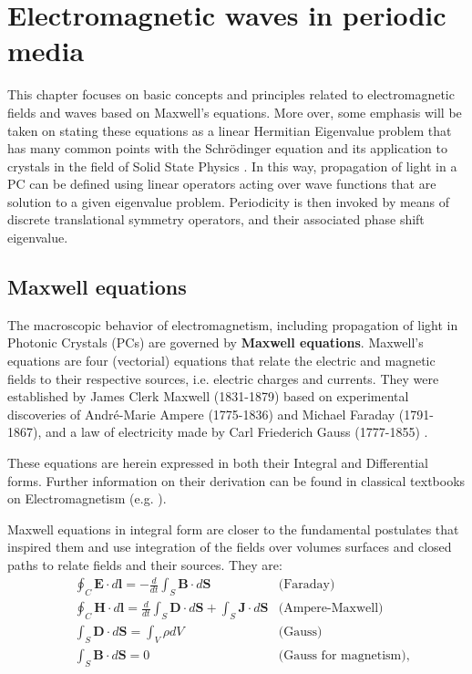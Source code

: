 \chapter{Electromagnetic waves in periodic media}
\label{ch:Electromagnetic waves in periodic media}

This chapter focuses on basic concepts and principles related to electromagnetic fields and waves based on Maxwell's equations. More over, some emphasis will be taken on stating these equations as a linear Hermitian Eigenvalue problem that has many common points with the Schr\"odinger equation and its application to crystals in the field of Solid State Physics \cite{Kittel2005}. 
In this way, propagation of light in a PC can be defined using linear operators acting over wave functions that are solution to a given eigenvalue problem.  Periodicity is then invoked by means of discrete translational symmetry operators, and their associated phase shift eigenvalue. 

\section{Maxwell equations}

The macroscopic behavior of electromagnetism, including propagation of light in Photonic Crystals (PCs) are governed by \textbf{Maxwell equations}. Maxwell's equations are four (vectorial) equations that relate the electric and magnetic fields to their respective sources, i.e. electric charges and currents. They were established by James Clerk Maxwell (1831-1879) based on experimental discoveries of Andr\'e-Marie Ampere (1775-1836) and Michael Faraday (1791-1867), and a law of electricity made by Carl Friederich Gauss (1777-1855) \cite{Jin2010}.

These equations are herein expressed in both their Integral and Differential forms. Further information on their derivation can be found in classical textbooks on Electromagnetism (e.g. \cite{Jackson1998}). 

Maxwell equations in integral form are closer to the fundamental postulates that inspired them and use integration of the fields over volumes surfaces and closed paths to relate fields and their sources. They are: 
\begin{align}
&\oint_C \mathbf{E}\cdot d\mathbf{l} = -\frac{d}{dt}\int_S \mathbf{B}\cdot d\mathbf{S} &\mbox{(Faraday)}\\
&\oint_C \mathbf{H}\cdot d\mathbf{l} = \frac{d}{dt}\int_S \mathbf{D}\cdot d\mathbf{S} + \int_S \mathbf{J}\cdot d\mathbf{S} &\mbox{(Ampere-Maxwell)}\\
&\int_S \mathbf{D}\cdot d\mathbf{S} = \int_V \rho dV &\mbox{(Gauss)} \label{eq:Gauss}\\
&\int_S \mathbf{B}\cdot d\mathbf{S} = 0 &\mbox{(Gauss for magnetism)},
\end{align}

